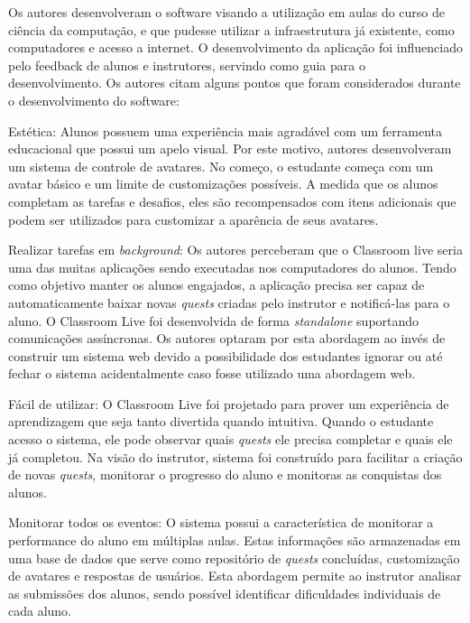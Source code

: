 \documentclass[
	12pt,				%
	oneside,			%
	a4paper,			%
	english,			%
	french,				%
	spanish,			%
	brazil,				%
	]{abntex2}
\begin{document}
Os autores desenvolveram o software visando a utilização em aulas do curso de ciência da computação, e que pudesse utilizar a infraestrutura já existente, como computadores e acesso a internet. O desenvolvimento da aplicação foi influenciado pelo feedback de alunos e instrutores, servindo como guia para o desenvolvimento. Os autores citam alguns pontos que foram considerados durante o desenvolvimento do software:

Estética: Alunos possuem uma experiência mais agradável com um ferramenta educacional que possui um apelo visual. Por este motivo, autores desenvolveram um sistema de controle de avatares. No começo, o estudante começa com um avatar básico e um limite de customizações possíveis. A medida que os alunos completam as tarefas e desafios, eles são recompensados com itens adicionais que podem ser utilizados para customizar a aparência de seus avatares.

Realizar tarefas em \textit{background}: Os autores perceberam que o Classroom live seria uma das muitas aplicações sendo executadas nos computadores do alunos. Tendo como objetivo manter os alunos engajados, a aplicação precisa ser capaz de automaticamente baixar novas \textit{quests} criadas pelo instrutor e notificá-las para o aluno. O Classroom Live foi desenvolvida de forma \textit{standalone} suportando comunicações assíncronas. Os autores optaram por esta abordagem ao invés de construir um sistema web devido a possibilidade dos estudantes ignorar ou até fechar o sistema acidentalmente caso fosse utilizado uma abordagem web.

Fácil de utilizar: O Classroom Live foi projetado para prover um experiência de aprendizagem que seja tanto divertida quando intuitiva. Quando o estudante acesso o sistema, ele pode observar quais \textit{quests} ele precisa completar e quais ele já completou. Na visão do instrutor, sistema foi construído para facilitar a criação de novas \textit{quests}, monitorar o progresso do aluno e monitoras as conquistas dos alunos.

Monitorar todos os eventos: O sistema possui a característica de monitorar a performance do aluno em múltiplas aulas. Estas informações são armazenadas em uma base de dados que serve como repositório de \textit{quests} concluídas, customização de avatares e respostas de usuários. Esta abordagem permite ao instrutor analisar as submissões dos alunos, sendo possível identificar dificuldades individuais de cada aluno. 
\end{document}
